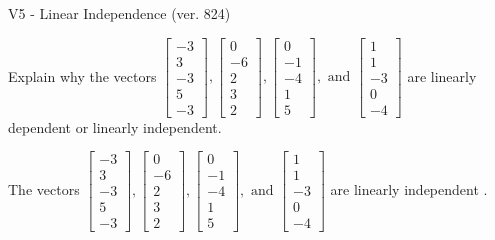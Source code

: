 \begin{exercise}
  \begin{exerciseTitle}V5 - Linear Independence (ver. 824)\end{exerciseTitle}
  \begin{exerciseStatement}
    Explain why the vectors \(\left[\begin{array}{r}
-3 \\
3 \\
-3 \\
5 \\
-3
\end{array}\right] , \left[\begin{array}{r}
0 \\
-6 \\
2 \\
3 \\
2
\end{array}\right] , \left[\begin{array}{r}
0 \\
-1 \\
-4 \\
1 \\
5
\end{array}\right] , \text{ and } \left[\begin{array}{r}
1 \\
1 \\
-3 \\
0 \\
-4
\end{array}\right]\) are linearly dependent or linearly independent.	


  \end{exerciseStatement}
  \begin{exerciseAnswer}
   The vectors \(\left[\begin{array}{r}
-3 \\
3 \\
-3 \\
5 \\
-3
\end{array}\right] , \left[\begin{array}{r}
0 \\
-6 \\
2 \\
3 \\
2
\end{array}\right] , \left[\begin{array}{r}
0 \\
-1 \\
-4 \\
1 \\
5
\end{array}\right] , \text{ and } \left[\begin{array}{r}
1 \\
1 \\
-3 \\
0 \\
-4
\end{array}\right]\) are 
  	 linearly independent  .
  


  \end{exerciseAnswer}
\end{exercise}